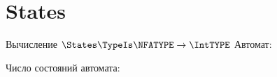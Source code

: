 \section{States}
\begin{frame}{Вычисление $\States\TypeIs\NFATYPE\to\IntTYPE$}
	Автомат:


	Число состояний автомата:

\end{frame}
